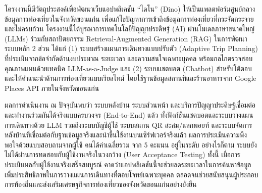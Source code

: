 
โครงงานนี้มีวัตถุประสงค์เพื่อพัฒนาเว็บแอปพลิเคชัน ``ไดโน'' (Dino) ให้เป็นแพลตฟอร์มศูนย์กลางข้อมูลการท่องเที่ยวในจังหวัดขอนแก่น เพื่อแก้ไขปัญหาการเข้าถึงข้อมูลการท่องเที่ยวที่กระจัดกระจายและไม่ครบถ้วน โครงงานนี้ได้บูรณาการเทคโนโลยีปัญญาประดิษฐ์ (AI) ผ่านโมเดลภาษาขนาดใหญ่ (LLMs) ร่วมกับสถาปัตยกรรม Retrieval-Augmented Generation (RAG) ในการพัฒนาระบบหลัก 2 ส่วน ได้แก่ (1) ระบบสร้างแผนการเดินทางแบบปรับตัว (Adaptive Trip Planning) ที่ประเมินจากข้อจำกัดด้านงบประมาณ ระยะเวลา และความสนใจเฉพาะบุคคล พร้อมกลไกตรวจสอบคุณภาพแผนด้วยเทคนิค LLM-as-a-Judge และ (2) ระบบแชตบอต (Chatbot) สำหรับโต้ตอบและให้คำแนะนำด้านการท่องเที่ยวแบบเรียลไทม์ โดยใช้ฐานข้อมูลสถานที่และร้านอาหารจาก Google Places API ภายในจังหวัดขอนแก่น

ผลการดำเนินงาน ณ ปัจจุบันพบว่า ระบบหลังบ้าน ระบบส่วนหน้า และบริการปัญญาประดิษฐ์เชื่อมต่อและทำงานร่วมกันได้จริงแบบครบวงจร (End-to-End) แล้ว ทั้งฟังก์ชันแชตบอตและระบบวางแผนการเดินทางด้วย LLM รวมถึงระบบบัญชีผู้ใช้ ระบบสแกน QR สะสม/แลกพอยท์ และระบบจัดการหลังบ้านที่เชื่อมต่อกับฐานข้อมูลจริงและนำขึ้นใช้งานบนเซิร์ฟเวอร์จริงแล้ว ผลการประเมินความพึงพอใจด้วยแบบสอบถามจากผู้ใช้ \surveyN{} คนได้ค่าเฉลี่ยรวม \surveyOverallMean{} จาก 5 คะแนน อยู่ในระดับ\surveyOverallLevel{} อย่างไรก็ตาม ระบบยังไม่ได้ผ่านการทดสอบกับผู้ใช้งานจริงในวงกว้าง (User Acceptance Testing) ทั้งนี้ เมื่อการประเมินผลกับผู้ใช้งานจริงเสร็จสมบูรณ์ คาดว่าแอปพลิเคชันนี้จะช่วยลดระยะเวลาในการค้นหาข้อมูล เพิ่มประสิทธิภาพในการวางแผนการเดินทางที่ตอบโจทย์เฉพาะบุคคล ตลอดจนช่วยสนับสนุนผู้ประกอบการท้องถิ่นและส่งเสริมเศรษฐกิจการท่องเที่ยวของจังหวัดขอนแก่นอย่างยั่งยืน
